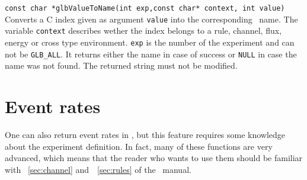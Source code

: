 \begin{function}
{\tt const char *glbValueToName(int exp,const char* context, int value)}
Converts a C index given as argument {\tt value} into the corresponding 
\AEDL\ name. The variable {\tt context} describes wether the index belongs
to a rule, channel, flux, energy or cross type environment. {\tt exp}
is the number of the experiment and can not be {\tt GLB\_ALL}. It returns
either the name in case of success or {\tt NULL} in case the name was not
found. The returned string must not be modified.
\end{function}



\section{Event rates}
\label{sec:event_rates}
One can also return event rates in \GLOBES , but this feature
requires some knowledge about the experiment definition. 
In fact, many of these functions are very advanced, which means
that the reader who wants to use them should be familiar with
\Secs~\ref{sec:channel} and~\Sec~\ref{sec:rules} of the \AEDL\ manual.

